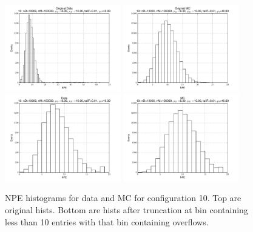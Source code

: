  \begin{figure}[htbp] \begin{center} 
\includegraphics[width=0.45\textwidth]{../FIGURES/10/FIG_Original_Data.pdf} 
\includegraphics[width=0.45\textwidth]{../FIGURES/10/FIG_Original_MC.pdf} 
\includegraphics[width=0.45\textwidth]{../FIGURES/10/FIG_Data.pdf} 
\includegraphics[width=0.45\textwidth]{../FIGURES/10/FIG_MC.pdf} 
\caption{NPE histograms for data and MC for configuration 10. Top are original hists. Bottom are hists after truncation at bin containing less than 10 entries with that bin containing overflows.} 
\label{tab:npe_10} 
\end{center} \end{figure} 

 